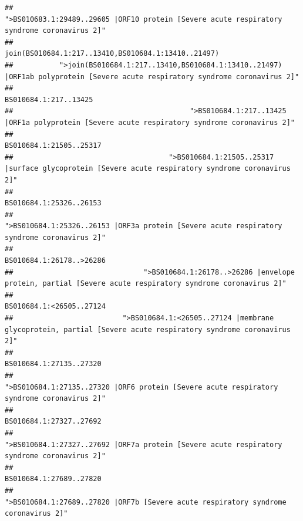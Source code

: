 \documentclass[
]{article}
\begin{document}
\begin{verbatim}
##                                            ">BS010683.1:29489..29605 |ORF10 protein [Severe acute respiratory syndrome coronavirus 2]" 
##                                                                                    join(BS010684.1:217..13410,BS010684.1:13410..21497) 
##           ">join(BS010684.1:217..13410,BS010684.1:13410..21497) |ORF1ab polyprotein [Severe acute respiratory syndrome coronavirus 2]" 
##                                                                                                                  BS010684.1:217..13425 
##                                          ">BS010684.1:217..13425 |ORF1a polyprotein [Severe acute respiratory syndrome coronavirus 2]" 
##                                                                                                                BS010684.1:21505..25317 
##                                     ">BS010684.1:21505..25317 |surface glycoprotein [Severe acute respiratory syndrome coronavirus 2]" 
##                                                                                                                BS010684.1:25326..26153 
##                                            ">BS010684.1:25326..26153 |ORF3a protein [Severe acute respiratory syndrome coronavirus 2]" 
##                                                                                                               BS010684.1:26178..>26286 
##                               ">BS010684.1:26178..>26286 |envelope protein, partial [Severe acute respiratory syndrome coronavirus 2]" 
##                                                                                                               BS010684.1:<26505..27124 
##                          ">BS010684.1:<26505..27124 |membrane glycoprotein, partial [Severe acute respiratory syndrome coronavirus 2]" 
##                                                                                                                BS010684.1:27135..27320 
##                                             ">BS010684.1:27135..27320 |ORF6 protein [Severe acute respiratory syndrome coronavirus 2]" 
##                                                                                                                BS010684.1:27327..27692 
##                                            ">BS010684.1:27327..27692 |ORF7a protein [Severe acute respiratory syndrome coronavirus 2]" 
##                                                                                                                BS010684.1:27689..27820 
##                                                    ">BS010684.1:27689..27820 |ORF7b [Severe acute respiratory syndrome coronavirus 2]" 

\end{verbatim}
\end{document}
